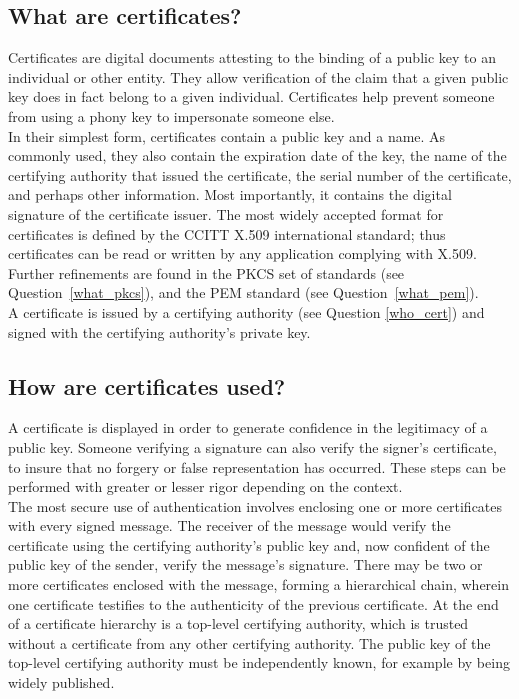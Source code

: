 \subsection{What are certificates?}
\label{what_cert}

Certificates are digital documents attesting to the binding of a public
key to an individual or other entity. They allow verification of the
claim that a given public key does in fact belong to a given
individual. Certificates help prevent someone from using a phony key to
impersonate someone else.\\

In their simplest form, certificates contain a public key and a name.  As
commonly used, they also contain the expiration date of the key, the name
of the certifying authority that issued the certificate, the serial number
of the certificate, and perhaps other information. Most importantly, it
contains the digital signature of the certificate issuer. The most widely
accepted format for certificates is defined by the CCITT X.509
international standard; thus certificates can be read or written by any
application complying with X.509. Further refinements are found in the PKCS
set of standards (see Question~\ref{what_pkcs}), and the PEM standard (see
Question~\ref{what_pem}).\\

A certificate is issued by a certifying authority (see Question
\ref{who_cert}) and signed with the certifying authority's private key.

\subsection{How are certificates used?}

A certificate is displayed in order to generate confidence in the
legitimacy of a public key. Someone verifying a signature can also
verify the signer's certificate, to insure that no forgery or false
representation has occurred. These steps can be performed with greater
or lesser rigor depending on the context.\\

The most secure use of authentication involves enclosing one or more
certificates with every signed message. The receiver of the message
would verify the certificate using the certifying authority's public
key and, now confident of the public key of the sender, verify the
message's signature. There may be two or more certificates enclosed
with the message, forming a hierarchical chain, wherein one certificate
testifies to the authenticity of the previous certificate. At the end
of a certificate hierarchy is a top-level certifying authority, which
is trusted without a certificate from any other certifying authority.
The public key of the top-level certifying authority must be
independently known, for example by being widely published.\\

